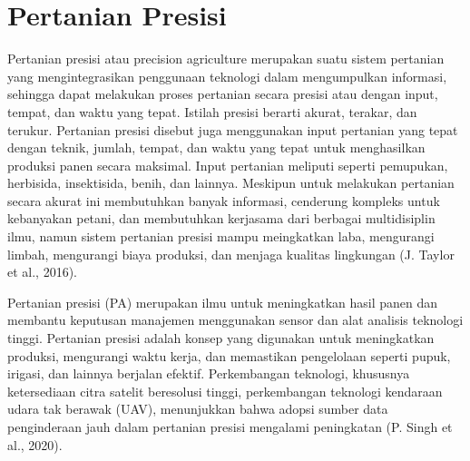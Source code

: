 
\section{Pertanian Presisi}
\hspace{1,2cm}Pertanian presisi atau precision agriculture merupakan suatu sistem pertanian yang mengintegrasikan penggunaan teknologi dalam mengumpulkan informasi, sehingga dapat melakukan proses pertanian secara presisi atau dengan input, tempat, dan waktu yang tepat. Istilah presisi berarti akurat, terakar, dan terukur. Pertanian presisi disebut juga menggunakan input pertanian yang tepat dengan teknik, jumlah, tempat, dan waktu yang tepat untuk menghasilkan produksi panen secara maksimal. Input pertanian meliputi seperti pemupukan, herbisida, insektisida, benih, dan lainnya. Meskipun untuk melakukan pertanian secara akurat ini membutuhkan banyak informasi, cenderung kompleks untuk kebanyakan petani, dan membutuhkan kerjasama dari berbagai multidisiplin ilmu, namun sistem pertanian presisi mampu meingkatkan laba, mengurangi limbah, mengurangi biaya produksi, dan menjaga kualitas lingkungan (J. Taylor et al., 2016). 

Pertanian presisi (PA) merupakan ilmu untuk meningkatkan hasil panen dan membantu keputusan manajemen menggunakan sensor dan alat analisis teknologi tinggi. Pertanian presisi adalah konsep yang digunakan untuk meningkatkan produksi, mengurangi waktu kerja, dan memastikan pengelolaan seperti pupuk, irigasi, dan lainnya berjalan efektif. Perkembangan teknologi, khususnya ketersediaan citra satelit beresolusi tinggi, perkembangan teknologi kendaraan udara tak berawak (UAV), menunjukkan bahwa adopsi sumber data penginderaan jauh dalam pertanian presisi mengalami peningkatan (P. Singh et al., 2020). 

